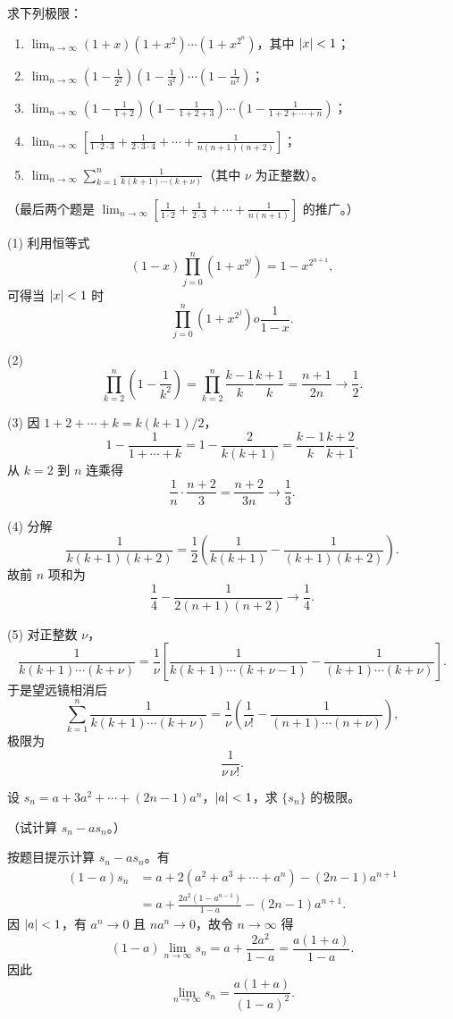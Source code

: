 \begin{xexercise}[3]
求下列极限：
  \begin{enumerate}[label=(\arabic*)]
    \item $\displaystyle\lim_{n\to\infty}(1+x)(1+x^2)\cdots(1+x^{2^n})$，其中 $\lvert x\rvert<1$；
    \item $\displaystyle\lim_{n\to\infty}\left(1-\frac1{2^2}\right)\left(1-\frac1{3^2}\right)\cdots\left(1-\frac1{n^2}\right)$；
    \item $\displaystyle\lim_{n\to\infty}\left(1-\frac1{1+2}\right)\left(1-\frac1{1+2+3}\right)\cdots\left(1-\frac1{1+2+\cdots+n}\right)$；
    \item $\displaystyle\lim_{n\to\infty}\left[\frac1{1\cdot2\cdot3}+\frac1{2\cdot3\cdot4}+\cdots+\frac1{n(n+1)(n+2)}\right]$；
    \item $\displaystyle\lim_{n\to\infty}\sum_{k=1}^n\frac1{k(k+1)\cdots(k+\nu)}$（其中 $\nu$ 为正整数）。
  \end{enumerate}
  （最后两个题是 $\displaystyle\lim_{n\to\infty}\left[\frac1{1\cdot2}+\frac1{2\cdot3}+\cdots+\frac1{n(n+1)}\right]$ 的推广。）
\end{xexercise}
\begin{xsolution}
(1) 利用恒等式
\[
  (1-x)\prod_{j=0}^n(1+x^{2^j})=1-x^{2^{n+1}},
\]
可得当 $\lvert x\rvert<1$ 时
\[
  \prod_{j=0}^n(1+x^{2^j})	o\frac1{1-x}.
\]

(2)
\[
  \prod_{k=2}^n\left(1-\frac1{k^2}\right)
  =\prod_{k=2}^n\frac{k-1}{k}\frac{k+1}{k}
  =\frac{n+1}{2n}\to\frac12.
\]

(3) 因 $1+2+\cdots+k=k(k+1)/2$，
\[
  1-\frac1{1+\cdots+k}
  =1-\frac2{k(k+1)}
  =\frac{k-1}{k}\frac{k+2}{k+1}.
\]
从 $k=2$ 到 $n$ 连乘得
\[
  \frac1n\cdot\frac{n+2}{3}=\frac{n+2}{3n}\to\frac13.
\]

(4) 分解
\[
  \frac1{k(k+1)(k+2)}
  =\frac12\left(\frac1{k(k+1)}-\frac1{(k+1)(k+2)}\right).
\]
故前 $n$ 项和为
\[
  \frac14-\frac1{2(n+1)(n+2)}\to\frac14.
\]

(5) 对正整数 $\nu$，
\[
  \frac1{k(k+1)\cdots(k+\nu)}
  =\frac1\nu\left[
    \frac1{k(k+1)\cdots(k+\nu-1)}
    -\frac1{(k+1)\cdots(k+\nu)}
  \right].
\]
于是望远镜相消后
\[
  \sum_{k=1}^n\frac1{k(k+1)\cdots(k+\nu)}
  =\frac1\nu\left(\frac1{\nu!}-\frac1{(n+1)\cdots(n+\nu)}\right),
\]
极限为
\[
  \boxed{\frac1{\nu\,\nu!}}.
\]
\end{xsolution}


\begin{xexercise}[4]
设 $s_n=a+3a^2+\cdots+(2n-1)a^n$，$\lvert a\rvert<1$，求 $\{s_n\}$ 的极限。

  （试计算 $s_n-as_n$。）
\end{xexercise}
\begin{xsolution}
按题目提示计算 $s_n-as_n$。有
\begin{align*}
  (1-a)s_n
  &=a+2(a^2+a^3+\cdots+a^n)-(2n-1)a^{n+1}\\
  &=a+\frac{2a^2(1-a^{n-1})}{1-a}-(2n-1)a^{n+1}.
\end{align*}
因 $\lvert a\rvert<1$，有 $a^n\to0$ 且 $na^n\to0$，故令 $n\to\infty$ 得
\[
  (1-a)\lim_{n\to\infty}s_n
  =a+\frac{2a^2}{1-a}
  =\frac{a(1+a)}{1-a}.
\]
因此
\[
  \boxed{\lim_{n\to\infty}s_n=\frac{a(1+a)}{(1-a)^2}}.
\]
\end{xsolution}


